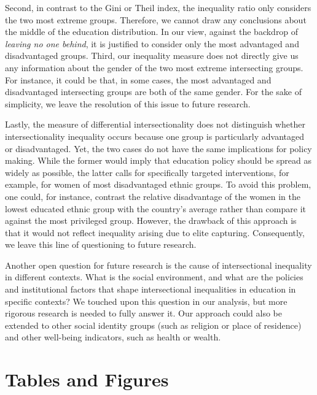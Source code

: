 Second, in contrast to the Gini or Theil index, the inequality ratio only considers the two most extreme groups. Therefore, we cannot draw any conclusions about the middle of the education distribution. In our view, against the backdrop of \textit{leaving no one behind}, it is justified to consider only the most advantaged and disadvantaged groups. Third, our inequality measure does not directly give us any information about the gender of the two most extreme intersecting groups. For instance, it could be that, in some cases, the most advantaged and disadvantaged intersecting groups are both of the same gender. For the sake of simplicity, we leave the resolution of this issue to future research. 

Lastly, the measure of differential intersectionality does not distinguish whether intersectionality inequality occurs because one group is particularly advantaged or disadvantaged. Yet, the two cases do not have the same implications for policy making. While the former would imply that education policy should be spread as widely as possible, the latter calls for specifically targeted interventions, for example, for women of most disadvantaged ethnic groups. To avoid this problem, one could, for instance, contrast the relative disadvantage of the women in the lowest educated ethnic group with the country's average rather than compare it against the most privileged group. However, the drawback of this approach is that it would not reflect inequality arising due to elite capturing. Consequently, we leave this line of questioning to future research. 

Another open question for future research is the cause of intersectional inequality in different contexts. What is the social environment, and what are the policies and institutional factors that shape intersectional inequalities in education in specific contexts? We touched upon this question in our analysis, but more rigorous research is needed to fully answer it. Our approach could also be extended to other social identity groups (such as religion or place of residence) and other well-being indicators, such as health or wealth.

\clearpage
\FloatBarrier


\clearpage

\section*{Tables and Figures}

